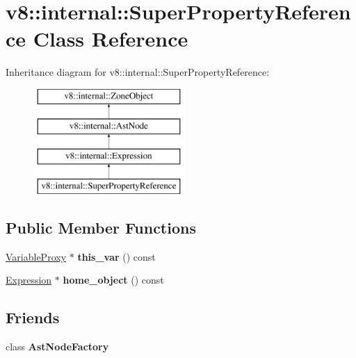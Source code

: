 \hypertarget{classv8_1_1internal_1_1SuperPropertyReference}{}\section{v8\+:\+:internal\+:\+:Super\+Property\+Reference Class Reference}
\label{classv8_1_1internal_1_1SuperPropertyReference}
Inheritance diagram for v8\+:\+:internal\+:\+:Super\+Property\+Reference\+:\begin{figure}[H]
\begin{center}
\leavevmode
\includegraphics[height=4.000000cm]{classv8_1_1internal_1_1SuperPropertyReference}
\end{center}
\end{figure}
\subsection*{Public Member Functions}
\begin{DoxyCompactItemize}
\item 
\mbox{\label{classv8_1_1internal_1_1SuperPropertyReference_a201015457397d0ba02f18c3ac0632d62}} 
\mbox{\hyperlink{classv8_1_1internal_1_1VariableProxy}{Variable\+Proxy}} $\ast$ {\bfseries this\+\_\+var} () const
\item 
\mbox{\label{classv8_1_1internal_1_1SuperPropertyReference_ab508ed3210c46e34f44ae7da6b8d84df}} 
\mbox{\hyperlink{classv8_1_1internal_1_1Expression}{Expression}} $\ast$ {\bfseries home\+\_\+object} () const
\end{DoxyCompactItemize}
\subsection*{Friends}
\begin{DoxyCompactItemize}
\item 
\mbox{\label{classv8_1_1internal_1_1SuperPropertyReference_a8d587c8ad3515ff6433eb83c578e795f}} 
class {\bfseries Ast\+Node\+Factory}
\end{DoxyCompactItemize}
